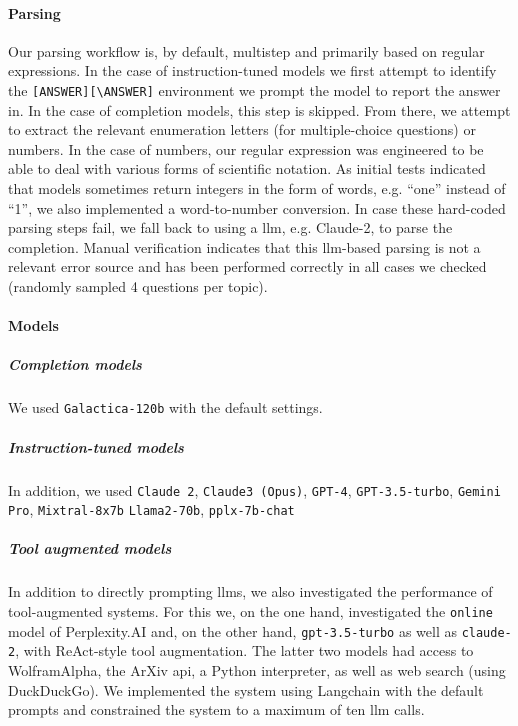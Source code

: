 \documentclass[11pt, oneside]{article}
\begin{document}
\begin{refsection}
\paragraph{Parsing}
Our parsing workflow is, by default, multistep and primarily based on regular expressions.
In the case of instruction-tuned models we first attempt to identify the \texttt{[ANSWER][\textbackslash ANSWER]} environment we prompt the model to report the answer in.
In the case of completion models, this step is skipped. From there, we attempt to extract the relevant enumeration letters (for multiple-choice questions) or numbers.
In the case of numbers, our regular expression was engineered to be able to deal with various forms of scientific notation.
As initial tests indicated that models sometimes return integers in the form of words, e.g. \enquote{one} instead of \enquote{1}, we also implemented a word-to-number conversion.
In case these hard-coded parsing steps fail, we fall back to using a \gls{llm}, e.g. Claude-2, to parse the completion.
Manual verification indicates that this \gls{llm}-based parsing is not a relevant error source and has been performed correctly in all cases we checked (randomly sampled 4 questions per topic).

\paragraph{Models}
\subparagraph{Completion models}
We used \texttt{Galactica-120b}\autocite{taylor2022galactica} with the default settings.


\subparagraph{Instruction-tuned models} In addition, we used \texttt{Claude 2}, \texttt{Claude3 (Opus)},\autocite{anthropicClaudeModelFamily2024} \texttt{GPT-4},\autocite{openai2024gpt4} \texttt{GPT-3.5-turbo},\autocite{brown2020language}
\texttt{Gemini Pro},\autocite{gemini}
\texttt{Mixtral-8x7b}\autocite{jiang2024mixtral}
\texttt{Llama2-70b},\autocite{touvron2023llama}
\texttt{pplx-7b-chat}

\subparagraph{Tool augmented models}
In addition to directly prompting \glspl{llm}, we also investigated the performance of tool-augmented systems.
For this we, on the one hand, investigated the \texttt{online} model of Perplexity.AI and, on the other hand, \texttt{gpt-3.5-turbo} as well as \texttt{claude-2}, with ReAct-style tool augmentation.\autocite{yao2023react}
The latter two models had access to WolframAlpha, the ArXiv \gls{api}, a Python interpreter, as well as web search (using DuckDuckGo).
We implemented the system using Langchain with the default prompts and constrained the system to a maximum of ten \gls{llm} calls.



\end{refsection}
\end{document}
